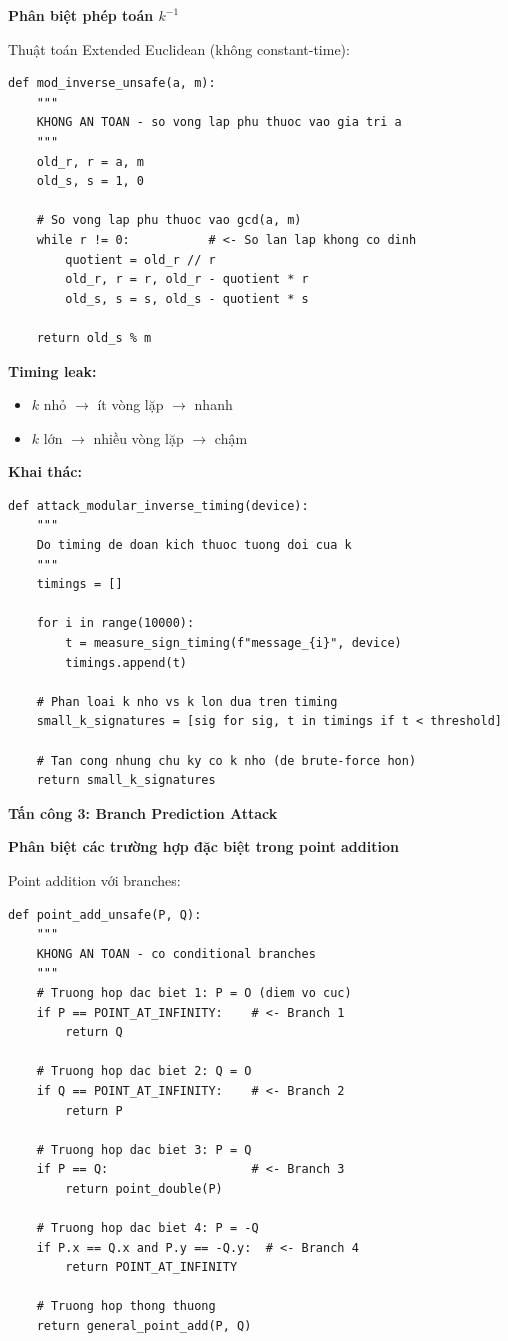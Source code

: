 \textbf{Phân biệt phép toán $k^{-1}$}

Thuật toán Extended Euclidean (không constant-time):

\begin{verbatim}
def mod_inverse_unsafe(a, m):
    """
    KHONG AN TOAN - so vong lap phu thuoc vao gia tri a
    """
    old_r, r = a, m
    old_s, s = 1, 0
    
    # So vong lap phu thuoc vao gcd(a, m)
    while r != 0:           # <- So lan lap khong co dinh
        quotient = old_r // r
        old_r, r = r, old_r - quotient * r
        old_s, s = s, old_s - quotient * s
    
    return old_s % m
\end{verbatim}

\textbf{Timing leak:}
\begin{itemize}
    \item $k$ nhỏ $\rightarrow$ ít vòng lặp $\rightarrow$ nhanh
    \item $k$ lớn $\rightarrow$ nhiều vòng lặp $\rightarrow$ chậm
\end{itemize}

\textbf{Khai thác:}

\begin{verbatim}
def attack_modular_inverse_timing(device):
    """
    Do timing de doan kich thuoc tuong doi cua k
    """
    timings = []
    
    for i in range(10000):
        t = measure_sign_timing(f"message_{i}", device)
        timings.append(t)
    
    # Phan loai k nho vs k lon dua tren timing
    small_k_signatures = [sig for sig, t in timings if t < threshold]
    
    # Tan cong nhung chu ky co k nho (de brute-force hon)
    return small_k_signatures
\end{verbatim}

\textbf{Tấn công 3: Branch Prediction Attack}

\textbf{Phân biệt các trường hợp đặc biệt trong point addition}

Point addition với branches:

\begin{verbatim}
def point_add_unsafe(P, Q):
    """
    KHONG AN TOAN - co conditional branches
    """
    # Truong hop dac biet 1: P = O (diem vo cuc)
    if P == POINT_AT_INFINITY:    # <- Branch 1
        return Q
    
    # Truong hop dac biet 2: Q = O
    if Q == POINT_AT_INFINITY:    # <- Branch 2
        return P
    
    # Truong hop dac biet 3: P = Q
    if P == Q:                    # <- Branch 3
        return point_double(P)
    
    # Truong hop dac biet 4: P = -Q
    if P.x == Q.x and P.y == -Q.y:  # <- Branch 4
        return POINT_AT_INFINITY
    
    # Truong hop thong thuong
    return general_point_add(P, Q)
\end{verbatim}

